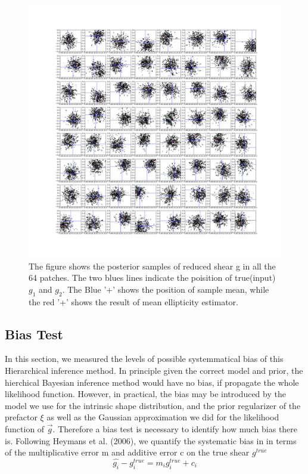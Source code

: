 \documentclass[useAMS,usenatbib]{mn2e}
\begin{document}
\begin{figure}
\end{figure}
\begin{figure}
\includegraphics[scale=0.15]{fig/test10}

\caption{The figure shows the posterior samples of reduced shear g
in all the 64 patches. The two blues lines indicate the poisition of
true(input) $g_{1}$ and $g_{2}$. The Blue '+' shows the position
of sample mean, while the red '+' shows the result of mean ellipticity
estimator.}
\end{figure}

\subsection{Bias Test}
In this section, we measured the levels of possible systemmatical
bias of this Hierarchical inference method. In principle given the correct model and prior,
the hierchical Bayesian inference method would have no bias, if propagate the whole likelihood function.
However, in practical, the bias may be introduced by the model we use for the intrinsic shape distribution,
and the prior regularizer of the prefactor $\xi$ as well as the Gaussian approximation we did for the likelihood
function of $\vec{g}$. Therefore a bias test is necessary to identify how much bias there is. 
Following Heymans et al. (2006), we quantify the systematic bias in
in terms of the multiplicative error m and additive error c on the
true shear $g^{true}$ 
\begin{equation}
\hat{g_{i}}-g_{i}^{true}=m_{i}g_{i}^{true}+c_{i}
\end{equation}
\end{document}
